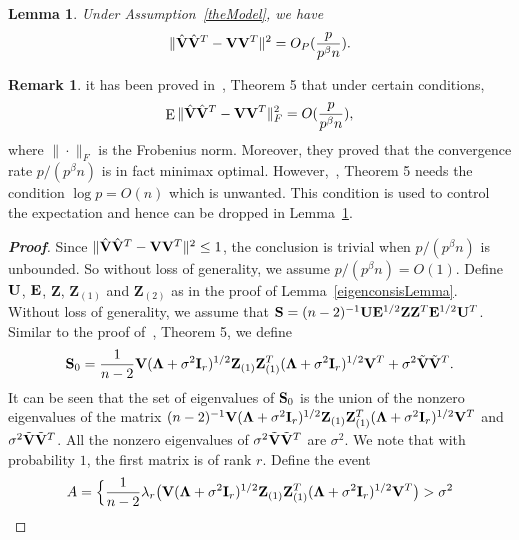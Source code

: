 \documentclass[review]{elsarticle}
\DeclareMathOperator{\myE}{E}
\newcommand{\bZ}{\mathbf{Z}}
\theoremstyle{plain}
\newtheorem{lemma}{\quad\quad Lemma}
\theoremstyle{definition}
\newtheorem{remark}{\quad\quad Remark}
\theoremstyle{remark}
\begin{document}
\begin{appendices}
\begin{lemma}\label{conRateLemma}
    Under Assumption~\ref{theModel}, we have
\begin{equation*}
\|\hat{\mathbf{V}}\hat{\mathbf{V}}^T-\mathbf{V}\mathbf{V}^T\|^2 =O_P(\frac{p}{p^{\beta}n}).
\end{equation*}
\end{lemma}
\begin{remark}
it has been proved in~\cite{Cai2012Sparse}, Theorem 5 that
 under certain conditions,
$$
\myE \|\hat{\BV}\hat{\BV}^T-\BV\BV^T\|_F^2 =O(\frac{p}{p^{\beta}n}),
    $$
    where $\|\cdot\|_F$ is the Frobenius norm.
    Moreover, they proved that the convergence rate $p/(p^{\beta}n)$ is in fact minimax optimal.
    However,~\cite{Cai2012Sparse}, Theorem 5 needs the condition $\log p=O(n)$ which is unwanted.
    This condition is used to control the expectation and hence can be dropped in Lemma~\ref{conRateLemma}.
\end{remark}
\begin{proof}[\textbf{Proof}]
    Since $\|\hat{\mathbf{V}}\hat{\mathbf{V}}^T-\mathbf{V}\mathbf{V}^T\|^2\leq 1$, the conclusion is trivial when $p/(p^{\beta} n)$ is unbounded.
    So without loss of generality, we assume $p/(p^{\beta} n)=O(1)$.
    Define $\mathbf{U}$, $\mathbf{E}$, $\bZ$, $\bZ_{(1)}$ and $\bZ_{(2)}$ as in the proof of Lemma~\ref{eigenconsisLemma}.
Without loss of generality, we assume that $\BS= (n-2)^{-1}\BU\BE^{1/2}\bZ \bZ^T \BE^{1/2} \BU^T$. 
    Similar to the proof of~\cite{Cai2012Sparse}, Theorem 5,
we define 
    $$
    \BS_0=
        \frac{1}{n-2}\BV(\bLambda+\sigma^2\BI_r)^{1/2}\bZ_{(1)} \bZ_{(1)}^T(\bLambda+\sigma^2\BI_r)^{1/2}\BV^T
        +\sigma^2\tilde{\BV}\tilde{\BV}^T.
    $$
    It can be seen that the set of eigenvalues of $\mathbf{S}_0$ is the union of the nonzero eigenvalues of the matrix $(n-2)^{-1}\BV(\bLambda+\sigma^2\BI_r)^{1/2}\bZ_{(1)} \bZ_{(1)}^T(\bLambda+\sigma^2\BI_r)^{1/2}\BV^T$ and $\sigma^2\tilde{\mathbf{V}}\tilde{\mathbf{V}}^T$.
All the nonzero eigenvalues of $\sigma^2\tilde{\mathbf{V}}\tilde{\mathbf{V}}^T$ are $\sigma^2$.
We note that with probability $1$, the first matrix is of rank $r$.
        Define the event
        $$
        A=
        \Big\{
        \frac{1}{n-2}\lambda_r\big(\BV(\bLambda+\sigma^2 \BI_r)^{1/2}\bZ_{(1)} \bZ_{(1)}^T(\bLambda+\sigma^2 \BI_r)^{1/2}\BV^T\big)
        >\sigma^2
$$
\end{proof}
\end{appendices}
\end{document}
